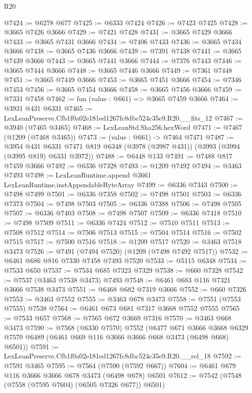 \begin{lexlean}{R20}
\begin{coremodule}
@7424 := @6278 @677
@7425 := @6333 @7424
@7426 := @7423 @7425
@7428 := @3665 @7426 @3666
@7429 := @7421 @7428
@7431 := @3665 @7429 @3666
@7433 := @3665 @7431 @3666
@7434 := @7406 @7433
@7436 := @3665 @7434 @3666
@7438 := @3665 @7436 @3666
@7439 := @7391 @7438
@7441 := @3665 @7439 @3666
@7443 := @3665 @7441 @3666
@7444 := @7376 @7443
@7446 := @3665 @7444 @3666
@7448 := @3665 @7446 @3666
@7449 := @7361 @7448
@7451 := @3665 @7449 @3666
@7453 := @3665 @7451 @3666
@7454 := @7346 @7453
@7456 := @3665 @7454 @3666
@7458 := @3665 @7456 @3666
@7459 := @7331 @7458
@7462 := fun (value : @661) => @3665 @7459 @3666
@7464 := @3931 @431 @6331
@7465 := LexLeanPreserve.Cfb1f0a02e181ed1267fc8dbc524c35e9.R20.__fits_12
@7467 := @3940 (@7465 @3465)
@7468 := LexLeanStd.Sha256.hexWord
@7471 := @7467 (@1209 (@7468 @3465))
@7473 := (value : @661) -> @7464 @7471
@7487 := @3954
    @431
    @6331
    @7471
    @819
    @6348
    (@3978 (@3987 @431))
    (@3993 (@3994 (@3995 @819) @6331 @3972))
@7488 := @6448 @133
@7491 := @7488 @817 @7459 @3666
@7492 := @6336 @7328
@7493 := @1209 @7492
@7494 := @3463 @7493
@7498 := LexLeanRuntime.append @3661 LexLeanRuntime.instAppendableByteArray
@7499 := @6336 @7343
@7500 := @7498 @7499
@7501 := @6336 @7358
@7502 := @7498 @7501
@7503 := @6336 @7373
@7504 := @7498 @7503
@7505 := @6336 @7388
@7506 := @7498 @7505
@7507 := @6336 @7403
@7508 := @7498 @7507
@7509 := @6336 @7418
@7510 := @7498 @7509
@7511 := @6336 @7424
@7512 := @7510 @7511
@7513 := @7508 @7512
@7514 := @7506 @7513
@7515 := @7504 @7514
@7516 := @7502 @7515
@7517 := @7500 @7516
@7518 := @1209 @7517
@7520 := @3463 @7518 @3473
@7526 := @7491 (@7494 @7520) (@1209 (@7498 @7492 @7517))
@7532 := @6461 @686 @816 @7330 @7458 @7493 @7520
@7533 := @5115 @6348
@7534 := @7533 @650
@7537 := @7534 @685 @7323 @7329
@7538 := @660 @7328
@7542 := @7537 (@3463 @7538 @3473) @7493
@7548 := @6461 @683 @116 @7321 @3666 @7538 @3473
@7551 := @6468 @682 @7319 @3666
@7552 := @660 @7326
@7553 := @3463 @7552
@7555 := @3463 @678 @3473
@7558 := @7551 (@7553 @7555) @7538
@7564 := @6461 @673 @681 @7317 @3668 @7552 @7555
@7565 := @7533 @657
@7568 := @7565 @672 @3669 @7316
@7570 := @3463 @668 @3473
@7590 := @7568
    (@6330 @7570)
    @7552
    (@6477
      @671
      @3666
      @3668
      @6329
      @7570
      @6489
      (@6461 @669 @116 @3666 @3666 @668 @3473 (@6498 @668) @6501))
@7591 := LexLeanPreserve.Cfb1f0a02e181ed1267fc8dbc524c35e9.R20.__rel_18
@7592 := @7591 @3465
@7595 := @7564 (@7590 (@7592 @667))
@7604 := @6461 @679 @116 @3666 @3666 @678 @3473 (@6498 @678) @6501
@7612 := @7542 (@7548 (@7558 (@7595 @7604) (@6505 @7326 @677)) @6501)

\end{coremodule}
\end{lexlean}
